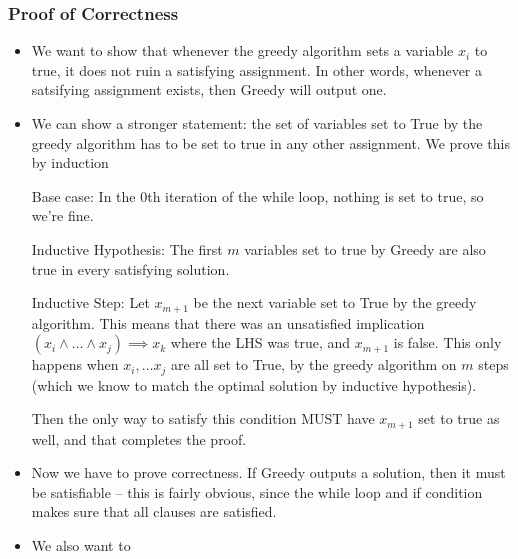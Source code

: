 \documentclass[10pt]{article}
\begin{document}
	\subsubsection{Proof of Correctness}
	\begin{itemize}
		\item We want to show that whenever the greedy algorithm sets a variable $x_i$ to true, it does not 
			ruin a satisfying assignment. In other words, whenever a satsifying assignment exists, 
			then Greedy will output one.
		\item We can show a stronger statement: the set of variables set to True by the greedy algorithm 
			has to be set to true in any other assignment. We prove this by induction 

			Base case: In the 0th iteration of the while loop, nothing is set to true, so we're fine.

			Inductive Hypothesis: The first $m$ variables set to true by Greedy are also true in every satisfying
			solution.

			Inductive Step: Let $x_{m+1}$ be the next variable set to True by the greedy algorithm.
			This means that there was an unsatisfied implication $(x_i \land \dots \land x_j) \implies x_k$ 
			where the LHS was true, and $x_{m+1}$ is false. This only happens when $x_i, \dots x_j$ are all 
			set to True, by the greedy algorithm on $m$ steps (which we know to match the optimal solution by 
			inductive hypothesis).

			Then the only way to satisfy this condition MUST have $x_{m+1}$ set to true as well, and that 
			completes the proof.
		\item Now we have to prove correctness. If Greedy outputs a solution, then it must be satisfiable --
			this is fairly obvious, since the while loop and if condition makes sure that all clauses are 
			satisfied. 
		\item We also want to 
	\end{itemize}
\end{document}
